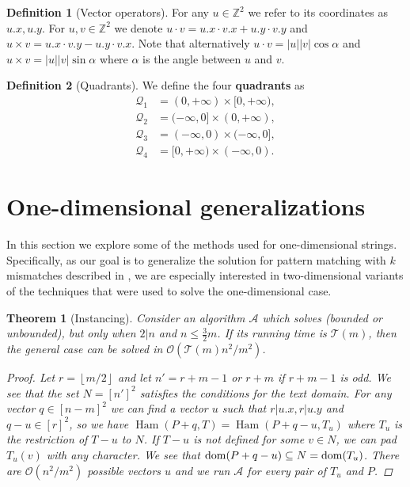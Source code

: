\documentclass[11pt]{article}
\newcommand{\Z}{\mathbb{Z}}
\renewcommand{\O}{\mathcal{O}}
\renewcommand{\phi}{\varphi}
\newcommand{\floor}[1]{\left\lfloor #1 \right\rfloor}
\newcommand{\eq}[1]{\begin{align*} #1 \end{align*}}
\theoremstyle{plain}
\newtheorem{theorem}{Theorem}
\theoremstyle{definition}
\newtheorem{definition}{Definition}
\theoremstyle{remark}
\DeclareMathOperator*{\Ham}{Ham}
\begin{document}
\newcommand{\x}[1]{#1.x}
\newcommand{\y}[1]{#1.y}
\newcommand{\h}[1]{\phi \times #1}
\newcommand{\s}[1]{\psi \times #1}
\begin{definition}[Vector operators]
	For any $u \in \Z^2$ we refer to its coordinates as $\x{u}, \y{u}$.
	For $u, v \in \Z^2$ we denote $u \cdot v = \x{u} \cdot \x{v} + \y{u} \cdot \y{v}$
	and $u \times v = \x{u} \cdot \y{v} - \y{u} \cdot \x{v}$.
	Note that alternatively $u \cdot v = |u||v| \cos \alpha$ and $u \times v = |u||v| \sin \alpha$ where $\alpha$ is the angle between $u$ and $v$.
\end{definition}


\newcommand{\Q}{\mathcal{Q}}
\begin{definition}[Quadrants]
	We define the four \textbf{quadrants} as
	\eq{
		\Q_1 &= (0, +\infty) \times [0, +\infty), \\
		\Q_2 &= (-\infty, 0] \times (0, +\infty), \\
		\Q_3 &= (-\infty, 0) \times (-\infty, 0], \\
		\Q_4 &= [0, +\infty) \times (-\infty, 0).
	}
\end{definition}


\section{One-dimensional generalizations}
In this section we explore some of the methods used for one-dimensional strings.
Specifically, as our goal is to generalize the solution for pattern matching with $k$ mismatches described in \cite{Gawrychowski2017}, we are especially interested in two-dimensional variants of the techniques that were used to solve the one-dimensional case.


\begin{theorem}[Instancing]\label{instancing}
	Consider an algorithm $\mathcal{A}$ which solves \HD (bounded or unbounded), but only when $2|n$ and $n \le \frac{3}{2}m$.
	If its running time is $\mathcal{T}(m)$, then the general case can be solved in $\O(\mathcal{T}(m) n^2 / m^2)$.
	\begin{proof}
		Let $r = \floor{m / 2}$ and let $n' = r + m - 1$ or $r + m$ if $r + m - 1$ is odd.
		We see that the set $N = [n']^2$ satisfies the conditions for the text domain.
		For any vector $q \in [n - m]^2$ we can find a vector $u$ such that $r|u.x, r|u.y$ and $q - u \in [r]^2$,
		so we have $\Ham(P + q, T) = \Ham(P + q - u, T_u)$ where $T_u$ is the restriction of $T - u$ to $N$.
		If $T - u$ is not defined for some $v \in N$, we can pad $T_u(v)$ with any character.
		We see that $\operatorname*{dom}(P + q - u) \subseteq N = \operatorname*{dom}(T_u)$.
		There are $\O(n^2 / m^2)$ possible vectors $u$ and we run $\mathcal{A}$ for every pair of $T_u$ and $P$.
	\end{proof}
\end{theorem}
\end{document}
